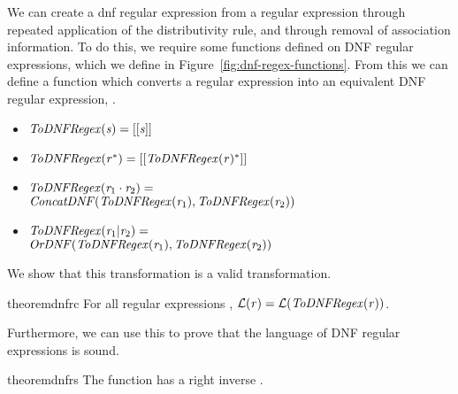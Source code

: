 
We can create a dnf regular expression from a regular expression through repeated
application of the distributivity rule, and through removal of association information.  To do this, we require some functions defined on DNF regular expressions,
which we define in Figure~\ref{fig:dnf-regex-functions}.
From this we can define a function which converts a regular expression into
an equivalent DNF regular expression, \ToDNFRegex{}.
\begin{definition}
\leavevmode
\begin{itemize}
\item $\mathit{ToDNFRegex}(\mathit{s})=[[\mathit{s}]]$
\item $\mathit{ToDNFRegex}(\mathit{r}^*) = [[\mathit{ToDNFRegex}(\mathit{r})^*]]$
\item $\mathit{ToDNFRegex}(\mathit{r}_1\cdot\mathit{r}_2) =$\\
\hspace*{1em}$\mathit{ConcatDNF}(\mathit{ToDNFRegex}(\mathit{r}_1),\mathit{ToDNFRegex}(\mathit{r}_2))$
\item $\mathit{ToDNFRegex}(\mathit{r}_1|\mathit{r}_2) =$\\
\hspace*{1em}$\mathit{OrDNF}(\mathit{ToDNFRegex}(\mathit{r}_1),\mathit{ToDNFRegex}(\mathit{r}_2))$
\end{itemize}
\end{definition}
We show that this transformation is a valid transformation.
\begin{restatable}{theorem}{dnfrc}
\label{thm:completeness-dnf-lenses}
For all regular expressions \Regex{},
$\mathcal{L}{}(\mathit{r})=\mathcal{L}{}(\mathit{ToDNFRegex}(\mathit{r}))$.
\end{restatable}

Furthermore, we can use this to prove that the language of DNF regular expressions is sound.

\begin{restatable}{theorem}{dnfrs}
\label{thm:soundness-dnf-lenses}
The function \ToDNFRegex{} has a right inverse \FromDNFRegex{}.
\end{restatable}

